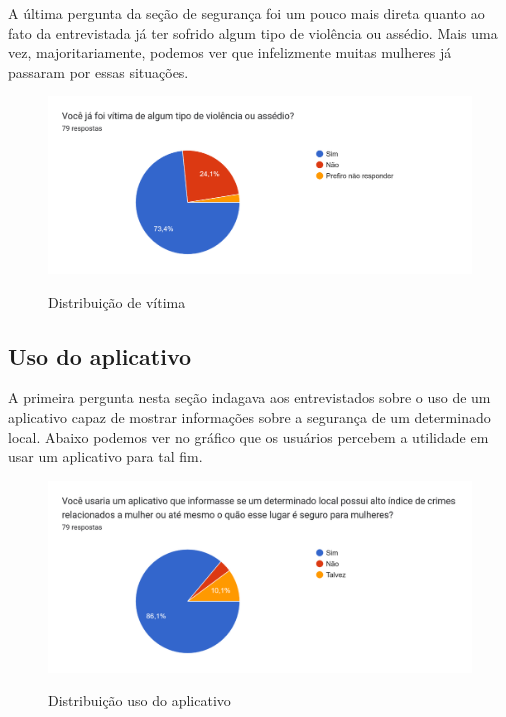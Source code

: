A última pergunta da seção de segurança foi um pouco mais direta quanto ao fato da entrevistada já ter sofrido algum tipo de violência ou assédio. Mais uma vez, majoritariamente, podemos ver que infelizmente muitas mulheres já passaram por essas situações. 
\begin{figure}[H]
  \includegraphics[width=0.5\linewidth]{images/distribuicao-vitma.png}\\
  \caption[Distribuição de vítima]{Distribuição de vítima}
  \label{fig:distribuicao-vitmal}
\end{figure}

\subsection{Uso do aplicativo}
A primeira pergunta nesta seção indagava aos entrevistados sobre o uso de um aplicativo capaz de mostrar informações sobre a segurança de um determinado local. Abaixo podemos ver no gráfico que os usuários percebem a utilidade em usar um aplicativo para tal fim.

\begin{figure}[h]
  \begin{center}
  \includegraphics[width=1.0\linewidth]{images/distribuicao-uso-aplicativo.png}\\
  \end{center}
  \caption[Distribuição uso do aplicativo]{Distribuição uso do aplicativo}
  \label{fig:distribuicao-uso-aplicativo}
\end{figure}

